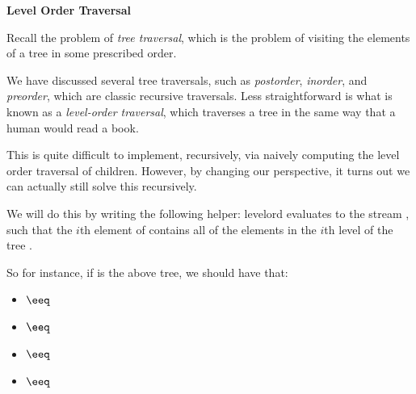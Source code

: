 
\textbf{Level Order Traversal}

Recall the problem of \textit{tree traversal}, which is the problem of visiting
the elements of a tree in some prescribed order.

We have discussed several tree traversals, such as \textit{postorder},
\textit{inorder}, and \textit{preorder}, which are classic recursive traversals.
Less straightforward is what is known as a \textit{level-order traversal}, which
traverses a tree in the same way that a human would read a book.

\begin{center}
\end{center}

This is quite difficult to implement, recursively, via naively computing
the level order traversal of children. However, by changing our perspective,
it turns out we can actually still solve this recursively.

We will do this by writing the following helper:
\spec
  {levelord}
  {}
  {}
  { evaluates to the stream , such that the
  $i$th element of  contains all of the elements in the $i$th
  level of the tree .}

So for instance, if  is the above tree, we should have that:
\begin{itemize}
  \item {} $\eeq$ 
  \item {} $\eeq$ 
  \item {} $\eeq$ 
  \item {} $\eeq$ 
\end{itemize}

